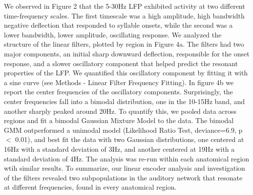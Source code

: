 We observed in Figure 2 that the 5-30Hz LFP exhibited activity at two different time-frequency scales. The first timescale was a high amplitude, high bandwidth negative deflection that responded to syllable onsets, while the second was a lower bandwidth, lower amplitude, oscillating response. We analyzed the structure of the linear filters, plotted by region in Figure 4a. The filters had two major components, an initial sharp downward deflection, responsible for the onset response, and a slower oscillatory component that helped predict the resonant properties of the LFP. We quantified this oscillatory component by fitting it with a sine curve (see Methods - Linear Filter Frequency Fitting). In figure 4b we report the center frequencies of the oscillatory components. Surprisingly, the center frequencies fall into a bimodal distribution, one in the 10-15Hz band, and another sharply peaked around 20Hz. To quantify this, we pooled data across regions and fit a bimodal Gaussian Mixture Model to the data. The bimodal GMM outperformed a unimodal model (Likelihood Ratio Test, deviance=6.9, p $<$ 0.01), and best fit the data with two Gaussian distributions, one centered at 16Hz with a standard deviation of 3Hz, and another centered at 19Hz with a standard deviation of 4Hz. The analysis was re-run within each anatomical region wtih similar results. To summarize, our linear encoder analysis and investigation of the filters revealed two subpopulations in the auditory network that resonate at different frequencies, found in every anatomical region.

